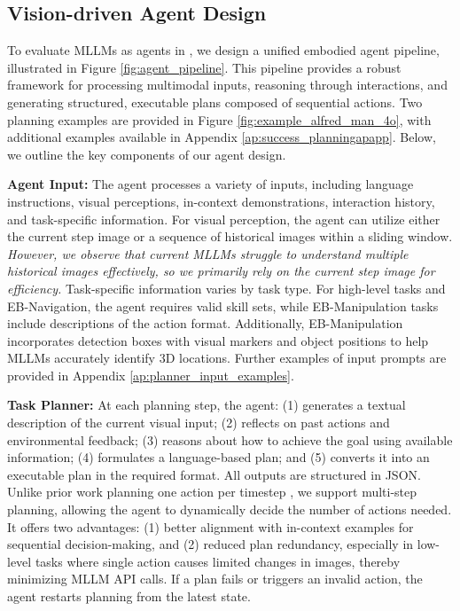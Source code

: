 \vspace{-7pt}


\subsection{Vision-driven Agent Design}\label{sec:agent}

To evaluate MLLMs as agents in \name, we design a unified embodied agent pipeline, illustrated in Figure \ref{fig:agent_pipeline}. 
This pipeline provides a robust framework for processing multimodal inputs, reasoning through interactions, and generating structured, executable plans composed of sequential actions. Two planning examples are provided in Figure \ref{fig:example_alfred_man_4o}, with additional examples available in Appendix \ref{ap:success_planningapapp}. Below, we outline the key components of our agent design.

\textbf{Agent Input:} 
The agent processes a variety of inputs, including language instructions, visual perceptions, in-context demonstrations, interaction history, and task-specific information. For visual perception, the agent can utilize either the current step image or a sequence of historical images within a sliding window. \emph{However, we observe that current MLLMs struggle to understand multiple historical images effectively, so we primarily rely on the current step image for efficiency.} Task-specific information varies by task type. For high-level tasks and EB-Navigation, the agent requires valid skill sets, while EB-Manipulation tasks include descriptions of the action format. Additionally, EB-Manipulation incorporates detection boxes with visual markers and object positions to help MLLMs accurately identify 3D locations. Further examples of input prompts are provided in Appendix \ref{ap:planner_input_examples}.


\textbf{Task Planner:} At each planning step, the agent: (1) generates a textual description of the current visual input; (2) reflects on past actions and environmental feedback; (3) reasons about how to achieve the goal using available information; (4) formulates a language-based plan; and (5) converts it into an executable plan in the required format. All outputs are structured in JSON. Unlike prior work planning one action per timestep \cite{liu2024visualagentbench}, we support multi-step planning, allowing the agent to dynamically decide the number of actions needed. It offers two advantages: (1) better alignment with in-context examples for sequential decision-making, and (2) reduced plan redundancy, especially in low-level tasks where single action causes limited changes in images, thereby minimizing MLLM API calls.
If a plan fails or triggers an invalid action, the agent restarts planning from the latest state.



